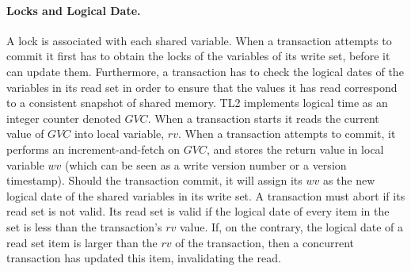 

\paragraph{Locks and Logical Date.}
A lock is associated with each shared variable.  
When a transaction attempts to commit it  first  has to  obtain  the  locks  of the
variables of its write set, before it can  
update them.
Furthermore, a  transaction has to  check the logical dates  of the
variables in its read set in  
order to  ensure that  the values  it has read  correspond to  a consistent
snapshot of shared memory.  TL2 implements logical time as an integer counter denoted $\mathit{GVC}$.
When a transaction starts it reads the current value of $\mathit{GVC}$ into local variable, $\mathit{rv}$. 
When a transaction attempts to commit, it performs an increment-and-fetch on $\mathit{GVC}$, and stores the 
return value in local variable $\mathit{wv}$ (which can be seen as a write version number  or a version timestamp). 
Should the transaction commit, it will assign its $\mathit{wv}$ as the new logical date of the shared variables in its write set. 
A transaction must abort if its read set is not valid.  
Its read set is valid if the logical date of every  item in the set is less than the transaction{}'s $\mathit{rv}$  value. 
If, on the  contrary, the logical date of a read set  item is larger than the $\mathit{rv}$ 
of the transaction,  then  a concurrent  transaction 
has updated this item, invalidating the read.

